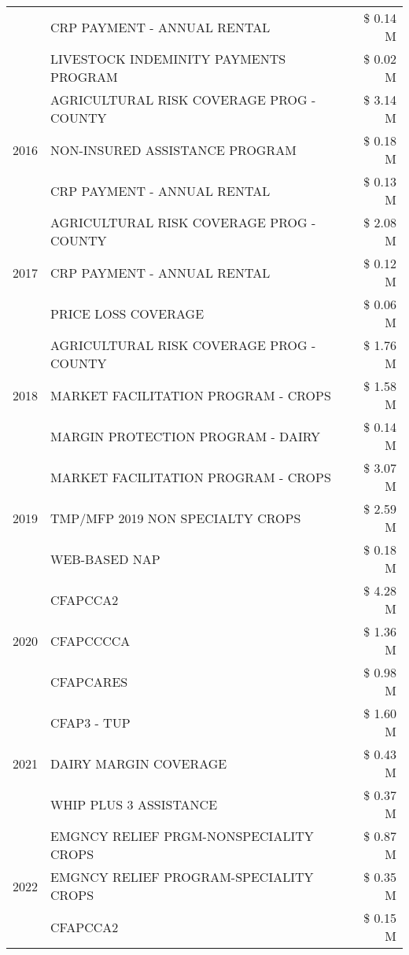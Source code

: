 \begin{tabular}{llr}
 & CRP PAYMENT - ANNUAL RENTAL & \$ 0.14 M \\
 & LIVESTOCK INDEMINITY PAYMENTS PROGRAM & \$ 0.02 M \\
\cline{1-3}
\multirow[t]{3}{*}{2016} & AGRICULTURAL RISK COVERAGE PROG - COUNTY & \$ 3.14 M \\
 & NON-INSURED ASSISTANCE PROGRAM & \$ 0.18 M \\
 & CRP PAYMENT - ANNUAL RENTAL & \$ 0.13 M \\
\cline{1-3}
\multirow[t]{3}{*}{2017} & AGRICULTURAL RISK COVERAGE PROG - COUNTY & \$ 2.08 M \\
 & CRP PAYMENT - ANNUAL RENTAL & \$ 0.12 M \\
 & PRICE LOSS COVERAGE & \$ 0.06 M \\
\cline{1-3}
\multirow[t]{3}{*}{2018} & AGRICULTURAL RISK COVERAGE PROG - COUNTY & \$ 1.76 M \\
 & MARKET FACILITATION PROGRAM - CROPS & \$ 1.58 M \\
 & MARGIN PROTECTION PROGRAM - DAIRY & \$ 0.14 M \\
\cline{1-3}
\multirow[t]{3}{*}{2019} & MARKET FACILITATION PROGRAM - CROPS & \$ 3.07 M \\
 & TMP/MFP 2019 NON SPECIALTY CROPS & \$ 2.59 M \\
 & WEB-BASED NAP & \$ 0.18 M \\
\cline{1-3}
\multirow[t]{3}{*}{2020} & CFAPCCA2 & \$ 4.28 M \\
 & CFAPCCCCA & \$ 1.36 M \\
 & CFAPCARES & \$ 0.98 M \\
\cline{1-3}
\multirow[t]{3}{*}{2021} & CFAP3 - TUP & \$ 1.60 M \\
 & DAIRY MARGIN COVERAGE & \$ 0.43 M \\
 & WHIP PLUS 3 ASSISTANCE & \$ 0.37 M \\
\cline{1-3}
\multirow[t]{3}{*}{2022} & EMGNCY RELIEF PRGM-NONSPECIALITY CROPS & \$ 0.87 M \\
 & EMGNCY RELIEF PROGRAM-SPECIALITY CROPS & \$ 0.35 M \\
 & CFAPCCA2 & \$ 0.15 M \\
\cline{1-3}
\bottomrule
\end{tabular}
